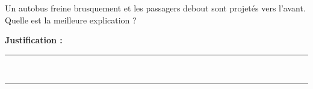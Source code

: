 Un autobus freine brusquement et les passagers debout sont projetés vers l'avant. Quelle est la meilleure explication ?

\choices

\noindent\textbf{Justification :} \hrulefill \\[2.5ex]
\rule{\linewidth}{0.4pt} \\[2.5ex]
\rule{\linewidth}{0.4pt}
\vfill
